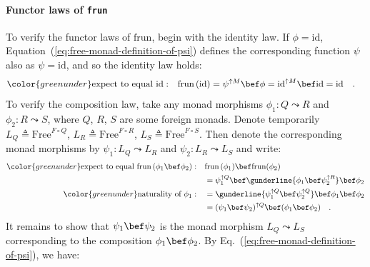 \paragraph{Functor laws of \texttt{frun}}

To verify the functor laws of $\text{frun}$, begin with the identity
law. If $\phi=\text{id}$, Equation~(\ref{eq:free-monad-definition-of-psi})
defines the corresponding function $\psi$ also as $\psi=\text{id}$,
and so the identity law holds:
\begin{align*}
{\color{greenunder}\text{expect to equal }\text{id}:}\quad & \text{frun}\,(\text{id})=\psi^{\uparrow M}\bef\phi=\text{id}^{\uparrow M}\bef\text{id}=\text{id}\quad.
\end{align*}
To verify the composition law, take any monad morphisms $\phi_{1}:Q\leadsto R$
and $\phi_{2}:R\leadsto S$, where $Q$, $R$, $S$ are some foreign
monads. Denote temporarily $L_{Q}\triangleq\text{Free}^{F\circ Q}$,
$L_{R}\triangleq\text{Free}^{F\circ R}$, $L_{S}\triangleq\text{Free}^{F\circ S}$.
Then denote the corresponding monad morphisms by $\psi_{1}:L_{Q}\leadsto L_{R}$
and $\psi_{2}:L_{R}\leadsto L_{S}$ and write:
\begin{align*}
{\color{greenunder}\text{expect to equal }\text{frun}\,(\phi_{1}\bef\phi_{2}):}\quad & \text{frun}\,(\phi_{1})\bef\text{frun}(\phi_{2})\\
 & =\psi_{1}^{\uparrow Q}\bef\gunderline{\phi_{1}\bef\psi_{2}^{\uparrow R}}\bef\phi_{2}\\
{\color{greenunder}\text{naturality of }\phi_{1}:}\quad & =\gunderline{\psi_{1}^{\uparrow Q}\bef\psi_{2}^{\uparrow Q}}\bef\phi_{1}\bef\phi_{2}\\
 & =(\psi_{1}\bef\psi_{2})^{\uparrow Q}\bef(\phi_{1}\bef\phi_{2})\quad.
\end{align*}
It remains to show that $\psi_{1}\bef\psi_{2}$ is the monad morphism
$L_{Q}\leadsto L_{S}$ corresponding to the composition $\phi_{1}\bef\phi_{2}$.
By Eq.~(\ref{eq:free-monad-definition-of-psi}), we have:
